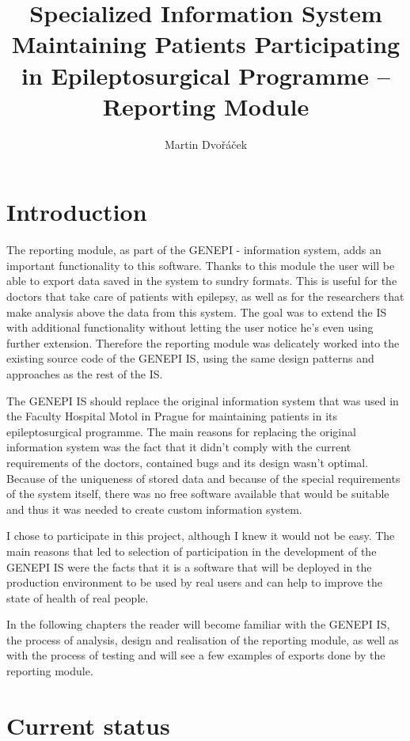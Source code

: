 \documentclass[thesis=B,english]{FITthesis}[2012/10/20]
\title{Specialized Information System Maintaining Patients Participating in Epileptosurgical Programme – Reporting Module}
\author{Martin Dvořáček} %
\begin{document}

\chapter{Introduction}
The reporting module, as part of the GENEPI - information system, adds an important functionality to this software. Thanks to this module the user will be able to export data saved in the system to sundry formats. This is useful for the doctors that take care of patients with epilepsy, as well as for the researchers that make analysis above the data from this system. The goal was to extend the IS with additional functionality without letting the user notice he's even using further extension. Therefore the reporting module was delicately worked into the existing source code of the GENEPI IS, using the same design patterns and approaches as the rest of the IS.

The GENEPI IS should replace the original information system that was used in the Faculty Hospital Motol in Prague for maintaining patients in its epileptosurgical programme. The main reasons for replacing the original information system was the fact that it didn't comply with the current requirements of the doctors, contained bugs and its design wasn't optimal. Because of the uniqueness of stored data and because of the special requirements of the system itself, there was no free software available that would be suitable and thus it was needed to create custom information system.

I chose to participate in this project, although I knew it would not be easy. The main reasons that led to selection of participation in the development of the GENEPI IS were the facts that it is a software that will be deployed in the production environment to be used by real users and can help to improve the state of health of real people. 

In the following chapters the reader will become familiar with the GENEPI IS, the process of analysis, design and realisation of the reporting module, as well as with the process of testing and will see a few examples of exports done by the reporting module.

\chapter{Current status}
\end{document}
